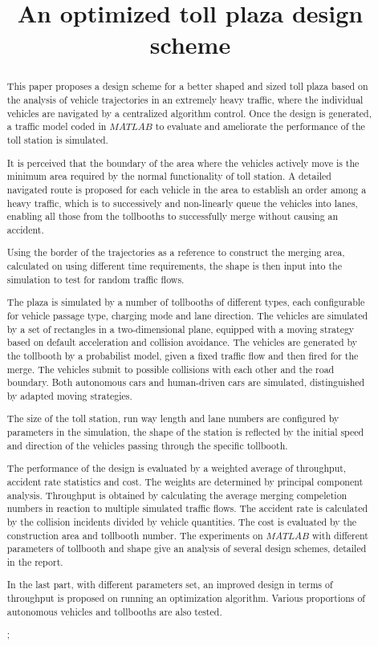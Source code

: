 \documentclass{mcmthesis}
\title{An optimized toll plaza design scheme}
\begin{document}
	
	
\begin{abstract}
	
This paper proposes a design scheme for a better shaped and sized toll plaza based on the analysis of vehicle trajectories in an extremely heavy traffic, where the individual vehicles are navigated by a centralized algorithm control. Once the design is generated, a traffic model coded in $MATLAB$ to evaluate and ameliorate the performance of the toll station is simulated.

It is perceived that the boundary of the area where the vehicles actively move is the minimum area required by the normal functionality of toll station. A detailed navigated route is proposed for each vehicle in the area to establish an order among a heavy traffic, which is to successively and non-linearly queue the vehicles into lanes, enabling all those from the tollbooths to successfully merge without causing an accident. 

Using the border of the trajectories as a reference to construct the merging area, calculated on using different time requirements, the shape is then input into the simulation to test for random traffic flows. 

The plaza is simulated by a number of tollbooths of different types, each configurable for vehicle passage type, charging mode and lane direction. The vehicles are simulated by a set of rectangles in a two-dimensional plane, equipped with a moving strategy based on default acceleration and collision avoidance. The vehicles are generated by the tollbooth by a probabilist model, given a fixed traffic flow and then fired for the merge. The vehicles submit to possible collisions with each other  and the road boundary. Both autonomous cars and human-driven cars are simulated, distinguished by adapted moving strategies.

The size of the toll station, run way length and lane numbers are configured by parameters in the simulation, the shape of the station is reflected by the initial speed and direction of the vehicles passing through the specific tollbooth. 

The performance of the design is evaluated by a weighted average of throughput, accident rate statistics and cost. The weights are determined by principal component analysis. Throughput is obtained by calculating the average merging compeletion numbers in reaction to multiple simulated traffic flows. The accident rate is calculated by the collision incidents divided by vehicle quantities. The cost is evaluated by the construction area and tollbooth number. The experiments on $MATLAB$ with different parameters of tollbooth and shape give an analysis of several design schemes, detailed in the report.

In the last part, with different parameters set, an improved design in terms of throughput is proposed on running an optimization algorithm. Various proportions of autonomous vehicles and tollbooths are also tested.

\begin{keywords}
;
\end{keywords}
\end{abstract}
\end{document}
